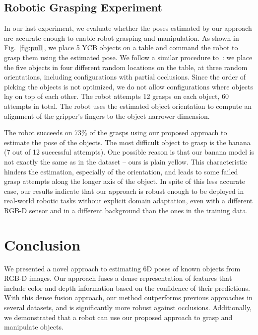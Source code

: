 \documentclass[10pt,twocolumn,letterpaper]{article}
\begin{document}
\vspace{-5pt}
\subsection{Robotic Grasping Experiment}

In our last experiment, we evaluate whether the poses estimated by our approach are accurate enough to enable robot grasping and manipulation. As shown in Fig.~\ref{fig:pull}, we place 5 YCB objects on a table and command the robot to grasp them using the estimated pose. We follow a similar procedure to~\citet{tremblay2018deep}: we place the five objects in four different random locations on the table, at three random orientations, including configurations with partial occlusions. Since the order of picking the objects is not optimized, we do not allow configurations where objects lay on top of each other. The robot attempts 12 grasps on each object, 60 attempts in total. The robot uses the estimated object orientation to compute an alignment of the gripper's fingers to the object narrower dimension. 

The robot succeeds on 73\% of the grasps using our proposed approach to estimate the pose of the objects. The most difficult object to grasp is the banana (7 out of 12 successful attempts). One possible reason is that our banana model is not exactly the same as in the dataset -- ours is plain yellow. This characteristic hinders the estimation, especially of the orientation, and leads to some failed grasp attempts along the longer axis of the object. In spite of this less accurate case, our results indicate that our approach is robust enough to be deployed in real-world robotic tasks without explicit domain adaptation, even with a different RGB-D sensor and in a different background than the ones in the training data.

\section{Conclusion}

We presented a novel approach to estimating 6D poses of known objects from RGB-D images. Our approach fuses a dense representation of features that include color and depth information based on the confidence of their predictions. With this dense fusion approach, our method outperforms previous approaches in several datasets, and is significantly more robust against occlusions. Additionally, we demonstrated that a robot can use our proposed approach to grasp and manipulate objects. 
\end{document}
